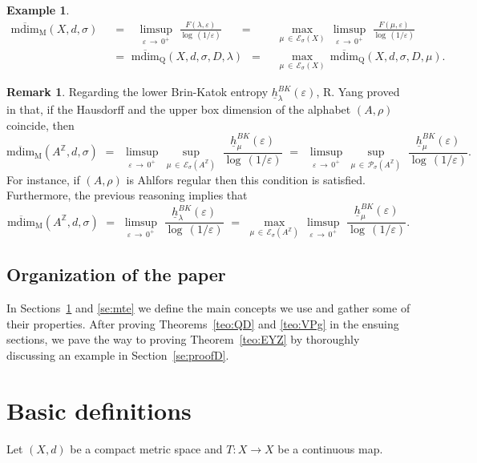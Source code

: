 \documentclass[11pt,a4paper,reqno]{amsart}
\theoremstyle{plain}
\newtheorem{example}[theorem]{Example}
\theoremstyle{definition}
\newtheorem{remark}[theorem]{Remark}
\newcommand{\field}[1]{\mathbb{#1}}
\newcommand{\ZZ}{\field{Z}}
\newcommand{\ep} {\varepsilon}
\newcommand{\vep}{\varepsilon}
\newcommand{\la} {\lambda}      \newcommand{\La}{\Lambda}
\newcommand{\ro}{\rho}
\newcommand{\cP}{{\mathcal P}}
\newcommand{\cE}{{\mathcal E}}
\begin{document}
\begin{example}
$$
\begin{alignedat}{2}
    \mathrm{\overline{mdim}_M}(X,d,\sigma) \,\,\,&=\,\,\,\,\,\limsup_{\vep\,\to\,0^+}\,\, \frac{F(\lambda,\ep)}{\log\,(1/\vep)}\,\,\,\,\,\, \,\,\,=\,\,\,\,  &\max_{\mu\,\in\,\cE_\sigma(X)} \,  \limsup_{\vep\,\to\,0^+}\,\, \frac{F(\mu,\ep)}{\log\,(1/\vep)}
    \\
    &=\,\,\mathrm{\overline{mdim}_Q}(X,d,\sigma,D,\la) \,\,\,=\,\,  &\max_{\mu\,\in\,\cE_\sigma(X)} \,  \mathrm{\overline{mdim}_Q}(X,d,\sigma,D,\mu).
\end{alignedat}
$$

\end{example}

\begin{remark}
Regarding the lower Brin-Katok entropy $\underline{h}_\lambda^{BK}(\vep)$, R. Yang proved in 
\cite[Theorem~3.9]{Yang} that, if the Hausdorff and the upper box dimension of the alphabet $(A,\ro)$ coincide, then $$\mathrm{\overline{mdim}_M}(A^\ZZ,d,\sigma) \,\, = \,\,
  \, \limsup_{\vep\,\to\,0^+}\,\sup_{\mu\,\in\,\cE_\sigma(A^\ZZ)}\,\, \frac{\underline{h}_\mu^{BK}(\vep)}{\log\,(1/\vep)}\,\, = \,\,
  \,  \limsup_{\vep\,\to\,0^+}\,\sup_{\mu\,\in\,\cP_\sigma(A^\ZZ)}\,\, \frac{\underline{h}_\mu^{BK}(\vep)}{\log\,(1/\vep)}.$$ For instance, if $(A,\ro)$ is Ahlfors regular then this condition is satisfied. Furthermore, the previous reasoning implies that
  $$\mathrm{\overline{mdim}_M}(A^\ZZ,d,\sigma)\,\, = \,\,
  \limsup_{\vep\,\to\,0^+}\,\, \frac{\underline{h}_\la^{BK}(\vep)}{\log\,(1/\vep)} \,\, = \,\,
  \max_{\mu\,\in\,\cE_\sigma(A^\ZZ)}\,  \limsup_{\vep\,\to\,0^+}\,\, \frac{\underline{h}_\mu^{BK}(\vep)}{\log\,(1/\vep)}.$$
\end{remark}


\subsection{Organization of the paper} In Sections~\ref{se:definition} and \ref{se:mte} we define the main concepts we use and gather some of their properties. After proving Theorems~\ref{teo:QD} and \ref{teo:VPg} in the ensuing sections, we pave the way to proving Theorem~\ref{teo:EYZ} by thoroughly discussing an example in Section~\ref{se:proofD}. 




\section{Basic definitions}\label{se:definition}
Let $(X,d)$ be a compact metric space and $T \colon X \to X$ be a continuous map.
\end{document}
